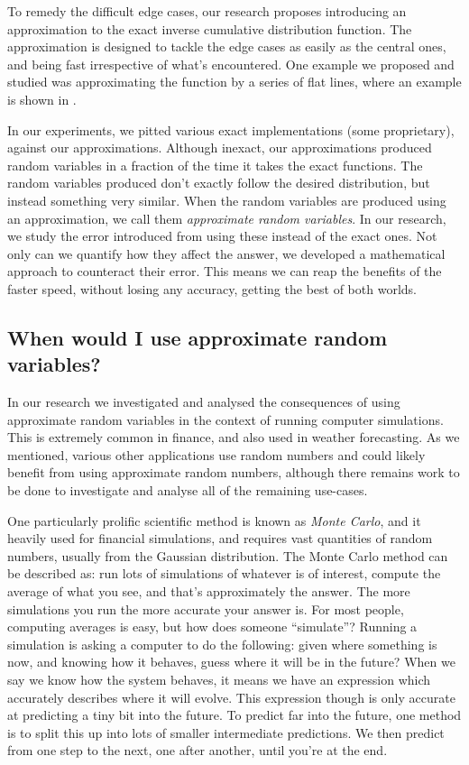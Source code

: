 \documentclass[11pt,a4paper,twoside,english]{extarticle}
\begin{document}
To remedy the difficult edge cases, our research proposes introducing an approximation to the exact inverse cumulative distribution function. The approximation is designed to tackle the edge cases as easily as the central ones, and being fast irrespective of what's encountered. One example we proposed and studied was approximating the function by a series of flat lines, where an example is shown in . 

In our experiments, we pitted various exact implementations (some proprietary), against our approximations. Although inexact, our approximations produced random variables in a fraction of the time it takes the exact functions. The random variables produced don't exactly follow the desired distribution, but instead something very similar. When the random variables are produced  using an approximation, we call them \emph{approximate random variables}. In our research, we study the error introduced from using these instead of the exact ones. Not only can we quantify how they affect the answer, we developed a mathematical approach to counteract their error. This means we can reap the benefits of the faster speed, without losing any accuracy, getting the best of both worlds. 

\subsection{When would I use approximate random variables?}
\label{sec:when_would_i_use_approximate_random_variables}

In our research we investigated and analysed the consequences of using approximate random variables in the context of running computer simulations. This is extremely common in finance, and also used in weather forecasting. As we mentioned, various other applications use random numbers and could likely benefit from using approximate random numbers, although there remains work to be done to investigate and analyse all of the remaining use-cases.

One particularly prolific scientific method is known as \emph{Monte Carlo}, and it heavily used for financial simulations, and requires vast quantities of random numbers, usually from the Gaussian distribution. The Monte Carlo method can be described as: run lots of simulations of whatever is of interest, compute the average of what you see, and that's approximately the answer. The more simulations you run the more accurate your answer is. For most people, computing averages is easy, but how does someone ``simulate''? Running a simulation is asking a computer to do the following: given where something is now, and knowing how it behaves, guess where it will be in the future? When we say we know how the system behaves, it means we have an expression which accurately describes where it will evolve. This expression though is only accurate at predicting a tiny bit into the future. To predict far into the future, one method is to split this up into lots of smaller intermediate predictions. We then predict from one step to the next, one after another, until you're at the end. 
\end{document}
